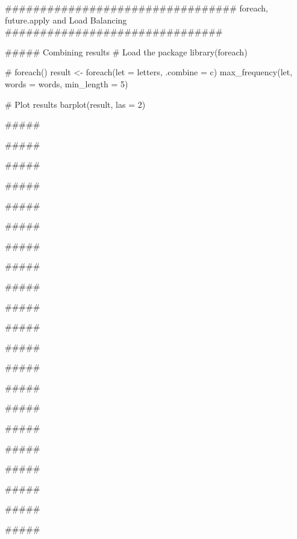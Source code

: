 ################################# foreach, future.apply and Load Balancing ###############################


##### Combining results
# Load the package
library(foreach)

# foreach() %
result <- foreach(let = letters, .combine = c) %
                max_frequency(let, words = words, min_length = 5)
            
# Plot results
barplot(result, las = 2)



##### 





##### 





##### 





##### 





##### 





##### 





##### 





##### 





##### 





##### 





##### 





##### 





##### 





##### 





##### 





##### 





##### 





##### 





##### 





##### 





##### 





